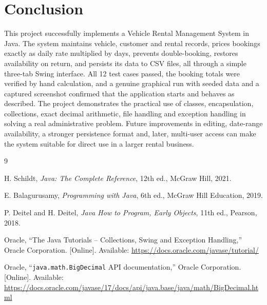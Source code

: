 \documentclass[11pt,a4paper]{article}
\begin{document}
\section{Conclusion}

This project successfully implements a Vehicle Rental Management
System in Java. The system maintains vehicle, customer and rental
records, prices bookings exactly as daily rate multiplied by days,
prevents double-booking, restores availability on return, and
persists its data to CSV files, all through a simple three-tab
Swing interface. All 12 test cases passed, the booking totals were
verified by hand calculation, and a genuine graphical run with
seeded data and a captured screenshot confirmed that the
application starts and behaves as described. The project
demonstrates the practical use of classes, encapsulation,
collections, exact decimal arithmetic, file handling and exception
handling in solving a real administrative problem. Future
improvements in editing, date-range availability, a stronger
persistence format and, later, multi-user access can make the
system suitable for direct use in a larger rental business.

\begin{thebibliography}{9}

 H. Schildt, \emph{Java: The Complete Reference},
12th ed., McGraw Hill, 2021.

 E. Balagurusamy, \emph{Programming with Java},
6th ed., McGraw Hill Education, 2019.

 P. Deitel and H. Deitel, \emph{Java How to Program,
Early Objects}, 11th ed., Pearson, 2018.

 Oracle, ``The Java Tutorials -- Collections, Swing
and Exception Handling,'' Oracle Corporation. [Online]. Available:
\url{https://docs.oracle.com/javase/tutorial/}

 Oracle, ``\texttt{java.math.BigDecimal} API
documentation,'' Oracle Corporation. [Online]. Available:
\url{https://docs.oracle.com/javase/17/docs/api/java.base/java/math/BigDecimal.html}

\end{thebibliography}
\end{document}
